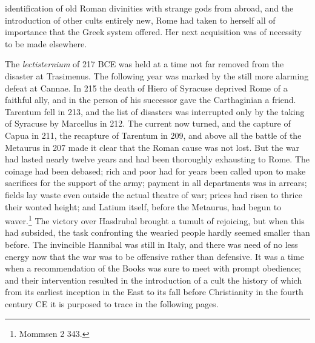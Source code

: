 \documentclass[a4paper, 11pt, oneside, polutonikogreek, french]{article}
\begin{document}
identification of old Roman divinities with strange gods from abroad, and the introduction of other cults entirely new, Rome had taken to herself all of importance that the Greek system offered. Her next acquisition was of necessity to be made elsewhere.

The \emph{lectisternium} of 217 \textsc{BCE} was held at a time not far removed from the disaster at Trasimenus. The following year was marked by the still more alarming defeat at Cannae. In 215 the death of Hiero of Syracuse deprived Rome of a faithful ally, and in the person of his successor gave the Carthaginian a friend. Tarentum fell in 213, and the list of disasters was interrupted only by the taking of Syracuse by Marcellus in 212. The current now turned, and the capture of Capua in 211, the recapture of Tarentum in 209, and above all the battle of the Metaurus in 207 made it clear that the Roman cause was not lost. But the war had lasted nearly twelve years and had been thoroughly exhausting to Rome. The coinage had been debased; rich and poor had for years been called upon to make sacrifices for the support of the army; payment in all departments was in arrears; fields lay waste even outside the actual theatre of war; prices had risen to thrice their wonted height; and Latium itself, before the Metaurus, had begun to waver.\footnote{Mommsen 2 343.} The victory over Hasdrubal brought a tumult of rejoicing, but when this had subsided, the task confronting the wearied people hardly seemed smaller than before. The invincible Hannibal was still in Italy, and there was need of no less energy now that the war was to be offensive rather than defensive. It was a time when a recommendation of the Books was sure to meet with prompt obedience; and their intervention resulted in the introduction of a cult the history of which from its earliest inception in the East to its fall before Christianity in the fourth century \textsc{CE} it is purposed to trace in the following pages.
\end{document}

